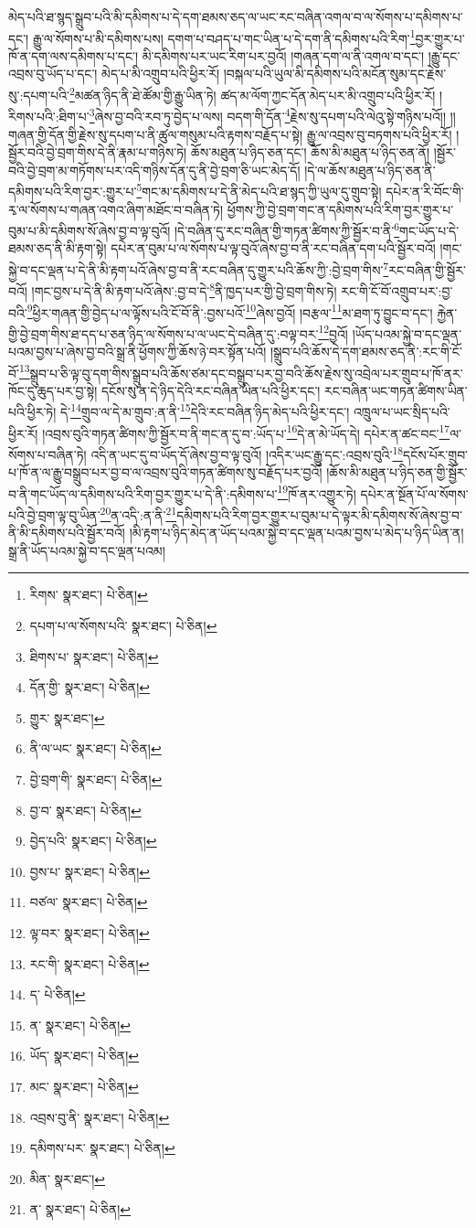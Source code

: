 མེད་པའི་ཐ་སྙད་སྒྲུབ་པའི་མི་དམིགས་པ་དེ་དག་ཐམས་ཅད་ལ་ཡང་རང་བཞིན་འགལ་བ་ལ་སོགས་པ་དམིགས་པ་དང་། རྒྱུ་ལ་སོགས་པ་མི་དམིགས་པས། དགག་པ་བཤད་པ་གང་ཡིན་པ་དེ་དག་ནི་དམིགས་པའི་རིག་\footnote{རིགས་  སྣར་ཐང་།  པེ་ཅིན། }བྱར་གྱུར་པ་ཁོ་ན་དག་ལས་དམིགས་པ་དང་། མི་དམིགས་པར་ཡང་རིག་པར་བྱའོ། །གཞན་དག་ལ་ནི་འགལ་བ་དང་། །རྒྱུ་དང་འབྲས་བུ་ཡོད་པ་དང་། མེད་པ་མི་འགྲུབ་པའི་ཕྱིར་རོ། །བསྐལ་པའི་ཡུལ་མི་དམིགས་པའི་མངོན་སུམ་དང་རྗེས་སུ་:དཔག་པའི་\footnote{དཔག་པ་ལ་སོགས་པའི་  སྣར་ཐང་།  པེ་ཅིན། }མཚན་ཉིད་ནི་ཐེ་ཚོམ་གྱི་རྒྱུ་ཡིན་ཏེ། ཚད་མ་ལོག་ཀྱང་དོན་མེད་པར་མི་འགྲུབ་པའི་ཕྱིར་རོ། །རིགས་པའི་:ཐིག་པ་\footnote{ཐིགས་པ་  སྣར་ཐང་།  པེ་ཅིན། }ཞེས་བྱ་བའི་རབ་ཏུ་བྱེད་པ་ལས། བདག་གི་དོན་\footnote{དོན་གྱི་  སྣར་ཐང་།  པེ་ཅིན། }རྗེས་སུ་དཔག་པའི་ལེའུ་སྟེ་གཉིས་པའོ།། །།གཞན་གྱི་དོན་གྱི་རྗེས་སུ་དཔག་པ་ནི་ཚུལ་གསུམ་པའི་རྟགས་བརྗོད་པ་སྟེ། རྒྱུ་ལ་འབྲས་བུ་བཏགས་པའི་ཕྱིར་རོ། །སྦྱོར་བའི་བྱེ་བྲག་གིས་དེ་ནི་རྣམ་པ་གཉིས་ཏེ། ཆོས་མཐུན་པ་ཉིད་ཅན་དང་། ཆོས་མི་མཐུན་པ་ཉིད་ཅན་ནོ། །སྦྱོར་བའི་བྱེ་བྲག་མ་གཏོགས་པར་འདི་གཉིས་དོན་དུ་ནི་བྱེ་བྲག་ཅི་ཡང་མེད་དོ། །དེ་ལ་ཆོས་མཐུན་པ་ཉིད་ཅན་ནི་དམིགས་པའི་རིག་བྱར་:གྱུར་པ་\footnote{གྱུར་  སྣར་ཐང་། }གང་མ་དམིགས་པ་དེ་ནི་མེད་པའི་ཐ་སྙད་ཀྱི་ཡུལ་དུ་གྲུབ་སྟེ། དཔེར་ན་རི་བོང་གི་རྭ་ལ་སོགས་པ་གཞན་འགའ་ཞིག་མཐོང་བ་བཞིན་ཏེ། ཕྱོགས་ཀྱི་བྱེ་བྲག་གང་ན་དམིགས་པའི་རིག་བྱར་གྱུར་པ་བུམ་པ་མི་དམིགས་སོ་ཞེས་བྱ་བ་ལྟ་བུའོ། །དེ་བཞིན་དུ་རང་བཞིན་གྱི་གཏན་ཚིགས་ཀྱི་སྦྱོར་བ་ནི་\footnote{ནི་ལ་ཡང་  སྣར་ཐང་།  པེ་ཅིན། }གང་ཡོད་པ་དེ་ཐམས་ཅད་ནི་མི་རྟག་སྟེ། དཔེར་ན་བུམ་པ་ལ་སོགས་པ་ལྟ་བུའོ་ཞེས་བྱ་བ་ནི་རང་བཞིན་དག་པའི་སྦྱོར་བའོ། །གང་སྐྱེ་བ་དང་ལྡན་པ་དེ་ནི་མི་རྟག་པའོ་ཞེས་བྱ་བ་ནི་རང་བཞིན་དུ་གྱུར་པའི་ཆོས་ཀྱི་:བྱེ་བྲག་གིས་\footnote{བྱེ་བྲག་གི་  སྣར་ཐང་།  པེ་ཅིན། }རང་བཞིན་གྱི་སྦྱོར་བའོ། །གང་བྱས་པ་དེ་ནི་མི་རྟག་པའོ་ཞེས་:བྱ་བ་དེ་\footnote{བྱ་བ་  སྣར་ཐང་།  པེ་ཅིན། }ནི་ཁྱད་པར་གྱི་བྱེ་བྲག་གིས་ཏེ། རང་གི་ངོ་བོ་འགྲུབ་པར་:བྱ་བའི་\footnote{བྱེད་པའི་  སྣར་ཐང་།  པེ་ཅིན། }ཕྱིར་གཞན་གྱི་བྱེད་པ་ལ་ལྟོས་པའི་ངོ་བོ་ནི་:བྱས་པའོ་\footnote{བྱས་པ་  སྣར་ཐང་།  པེ་ཅིན། }ཞེས་བྱའོ། །བརྩལ་\footnote{བཙལ་  སྣར་ཐང་།  པེ་ཅིན། }མ་ཐག་ཏུ་བྱུང་བ་དང་། རྐྱེན་གྱི་བྱེ་བྲག་གིས་ཐ་དད་པ་ཅན་ཉིད་ལ་སོགས་པ་ལ་ཡང་དེ་བཞིན་དུ་:བལྟ་བར་\footnote{ལྟ་བར་  སྣར་ཐང་།  པེ་ཅིན། }བྱའོ། །ཡོད་པའམ་སྐྱེ་བ་དང་ལྡན་པའམ་བྱས་པ་ཞེས་བྱ་བའི་སྒྲ་ནི་ཕྱོགས་ཀྱི་ཆོས་ཉེ་བར་སྟོན་པའོ། །སྒྲུབ་པའི་ཆོས་དེ་དག་ཐམས་ཅད་ནི་:རང་གི་ངོ་བོ་\footnote{རང་གི་  སྣར་ཐང་།  པེ་ཅིན། }སྒྲུབ་པ་ཅི་ལྟ་བུ་དག་གིས་སྒྲུབ་པའི་ཆོས་ཙམ་དང་བསྒྲུབ་པར་བྱ་བའི་ཆོས་རྗེས་སུ་འབྲེལ་པར་གྲུབ་པ་ཁོ་ནར་ཁོང་དུ་ཆུད་པར་བྱ་སྟེ། དངོས་སུ་ན་དེ་ཉིད་དེའི་རང་བཞིན་ཡིན་པའི་ཕྱིར་དང་། རང་བཞིན་ཡང་གཏན་ཚིགས་ཡིན་པའི་ཕྱིར་ཏེ། དེ་\footnote{ད་  པེ་ཅིན། }གྲུབ་ལ་དེ་མ་གྲུབ་:ན་ནི་\footnote{ན་  སྣར་ཐང་།  པེ་ཅིན། }དེའི་རང་བཞིན་ཉིད་མེད་པའི་ཕྱིར་དང་། འཁྲུལ་པ་ཡང་སྲིད་པའི་ཕྱིར་རོ། །འབྲས་བུའི་གཏན་ཚིགས་ཀྱི་སྦྱོར་བ་ནི་གང་ན་དུ་བ་:ཡོད་པ་\footnote{ཡོད་  སྣར་ཐང་།  པེ་ཅིན། }དེ་ན་མེ་ཡོད་དེ། དཔེར་ན་ཚང་བང་\footnote{མང་  སྣར་ཐང་།  པེ་ཅིན། }ལ་སོགས་པ་བཞིན་ཏེ། འདི་ན་ཡང་དུ་བ་ཡོད་དོ་ཞེས་བྱ་བ་ལྟ་བུའོ། །འདིར་ཡང་རྒྱུ་དང་:འབྲས་བུའི་\footnote{འབྲས་བུ་ནི་  སྣར་ཐང་།  པེ་ཅིན། }དངོས་པོར་གྲུབ་པ་ཁོ་ན་ལ་རྒྱུ་བསྒྲུབ་པར་བྱ་བ་ལ་འབྲས་བུའི་གཏན་ཚིགས་སུ་བརྗོད་པར་བྱའོ། །ཆོས་མི་མཐུན་པ་ཉིད་ཅན་གྱི་སྦྱོར་བ་ནི་གང་ཡོད་ལ་དམིགས་པའི་རིག་བྱར་གྱུར་པ་དེ་ནི་:དམིགས་པ་\footnote{དམིགས་པར་  སྣར་ཐང་།  པེ་ཅིན། }ཁོ་ནར་འགྱུར་ཏེ། དཔེར་ན་སྔོན་པོ་ལ་སོགས་པའི་བྱེ་བྲག་ལྟ་བུ་ཡིན་\footnote{མིན་  སྣར་ཐང་། }ན་འདི་:ན་ནི་\footnote{ན་  སྣར་ཐང་།  པེ་ཅིན། }དམིགས་པའི་རིག་བྱར་གྱུར་པ་བུམ་པ་དེ་ལྟར་མི་དམིགས་སོ་ཞེས་བྱ་བ་ནི་མི་དམིགས་པའི་སྦྱོར་བའོ། །མི་རྟག་པ་ཉིད་མེད་ན་ཡོད་པའམ་སྐྱེ་བ་དང་ལྡན་པའམ་བྱས་པ་མེད་པ་ཉིད་ཡིན་ན། སྒྲ་ནི་ཡོད་པའམ་སྐྱེ་བ་དང་ལྡན་པའམ། 